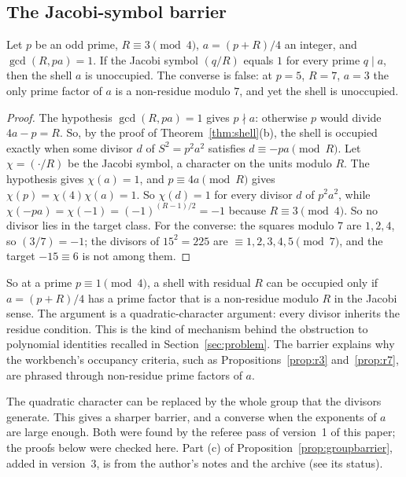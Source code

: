 \subsection{The Jacobi-symbol barrier}\label{ssec:jacobi}

\begin{proposition}\label{prop:jacobi}
Let $p$ be an odd prime, $R\equiv3\pmod4$, $a=(p+R)/4$ an integer, and $\gcd(R,pa)=1$. If the Jacobi symbol $(q/R)$ equals $1$ for every prime $q\mid a$, then the shell $a$ is unoccupied. The converse is false: at $p=5$, $R=7$, $a=3$ the only prime factor of $a$ is a non-residue modulo $7$, and yet the shell is unoccupied.
\end{proposition}
\begin{proof}
The hypothesis $\gcd(R,pa)=1$ gives $p\nmid a$: otherwise $p$ would divide $4a-p=R$. So, by the proof of Theorem~\ref{thm:shell}(b), the shell is occupied exactly when some divisor $d$ of $S^2=p^2a^2$ satisfies $d\equiv-pa\pmod R$. Let $\chi=(\cdot/R)$ be the Jacobi symbol, a character on the units modulo $R$. The hypothesis gives $\chi(a)=1$, and $p\equiv4a\pmod R$ gives $\chi(p)=\chi(4)\chi(a)=1$. So $\chi(d)=1$ for every divisor $d$ of $p^2a^2$, while $\chi(-pa)=\chi(-1)=(-1)^{(R-1)/2}=-1$ because $R\equiv3\pmod4$. So no divisor lies in the target class.
For the converse: the squares modulo $7$ are $1,2,4$, so $(3/7)=-1$; the divisors of $15^2=225$ are $\equiv1,2,3,4,5\pmod7$, and the target $-15\equiv6$ is not among them.
\end{proof}

So at a prime $p\equiv1\pmod4$, a shell with residual $R$ can be occupied only if $a=(p+R)/4$ has a prime factor that is a non-residue modulo $R$ in the Jacobi sense. The argument is a quadratic-character argument: every divisor inherits the residue condition. This is the kind of mechanism behind the obstruction to polynomial identities recalled in Section~\ref{sec:problem}. The barrier explains why the workbench's occupancy criteria, such as Propositions~\ref{prop:r3} and~\ref{prop:r7}, are phrased through non-residue prime factors of $a$.

The quadratic character can be replaced by the whole group that the divisors generate. This gives a sharper barrier, and a converse when the exponents of $a$ are large enough. Both were found by the referee pass of version~1 of this paper; the proofs below were checked here. Part (c) of Proposition~\ref{prop:groupbarrier}, added in version~3, is from the author's notes and the archive (see its status).

